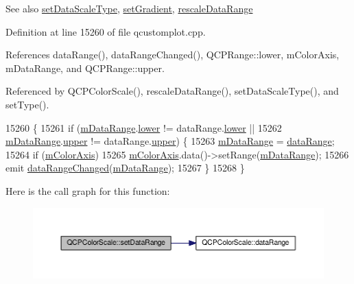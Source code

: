 \begin{DoxySeeAlso}{See also}
\hyperlink{class_q_c_p_color_scale_aeb6107d67dd7325145b2498abae67fc3}{set\+Data\+Scale\+Type}, \hyperlink{class_q_c_p_color_scale_a1f29583bb6f1e7f473b62fb712be3940}{set\+Gradient}, \hyperlink{class_q_c_p_color_scale_a425983db4478543924ddbd04ea20a356}{rescale\+Data\+Range} 
\end{DoxySeeAlso}


Definition at line 15260 of file qcustomplot.\+cpp.



References data\+Range(), data\+Range\+Changed(), Q\+C\+P\+Range\+::lower, m\+Color\+Axis, m\+Data\+Range, and Q\+C\+P\+Range\+::upper.



Referenced by Q\+C\+P\+Color\+Scale(), rescale\+Data\+Range(), set\+Data\+Scale\+Type(), and set\+Type().


\begin{DoxyCode}
15260                                                           \{
15261   \textcolor{keywordflow}{if} (\hyperlink{class_q_c_p_color_scale_a5d4853feb32cd0077bb2b871687c844b}{mDataRange}.\hyperlink{class_q_c_p_range_aa3aca3edb14f7ca0c85d912647b91745}{lower} != dataRange.\hyperlink{class_q_c_p_range_aa3aca3edb14f7ca0c85d912647b91745}{lower} ||
15262       \hyperlink{class_q_c_p_color_scale_a5d4853feb32cd0077bb2b871687c844b}{mDataRange}.\hyperlink{class_q_c_p_range_ae44eb3aafe1d0e2ed34b499b6d2e074f}{upper} != dataRange.\hyperlink{class_q_c_p_range_ae44eb3aafe1d0e2ed34b499b6d2e074f}{upper}) \{
15263     \hyperlink{class_q_c_p_color_scale_a5d4853feb32cd0077bb2b871687c844b}{mDataRange} = \hyperlink{class_q_c_p_color_scale_a52134696d5e04074fff4227d92d96f7b}{dataRange};
15264     \textcolor{keywordflow}{if} (\hyperlink{class_q_c_p_color_scale_a2efbc90fd31898fe05d2b74a8422b1d5}{mColorAxis})
15265       \hyperlink{class_q_c_p_color_scale_a2efbc90fd31898fe05d2b74a8422b1d5}{mColorAxis}.data()->setRange(\hyperlink{class_q_c_p_color_scale_a5d4853feb32cd0077bb2b871687c844b}{mDataRange});
15266     emit \hyperlink{class_q_c_p_color_scale_a293176da9447ec6819be1d901966a257}{dataRangeChanged}(\hyperlink{class_q_c_p_color_scale_a5d4853feb32cd0077bb2b871687c844b}{mDataRange});
15267   \}
15268 \}
\end{DoxyCode}


Here is the call graph for this function\+:\nopagebreak
\begin{figure}[H]
\begin{center}
\leavevmode
\includegraphics[width=350pt]{class_q_c_p_color_scale_abe88633003a26d1e756aa74984587fef_cgraph}
\end{center}
\end{figure}





